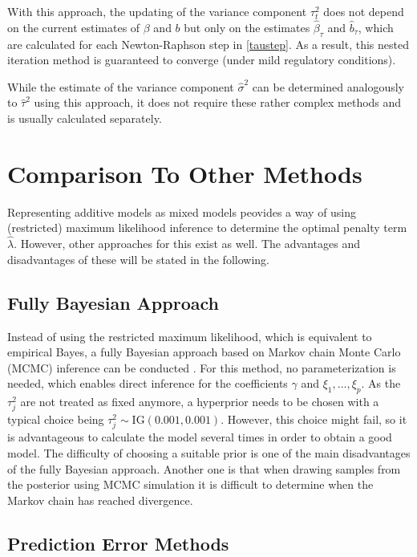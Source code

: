\documentclass[12pt]{article}
\begin{document}
With this approach, the updating of the variance component $\tau^2_t$ does not depend on the current estimates of $\beta$ and $b$ but only on the estimates $\hat{\beta}_{\tau}$ and $\hat{b}_\tau$, which are calculated for each Newton-Raphson step in \ref{taustep}. As a result, this nested iteration method is guaranteed to converge (under mild regulatory conditions).



While the estimate of the variance component $\hat{\sigma}^2$ can be determined analogously to $\hat{\tau}^2$ using this approach, it does not require these rather complex methods and is usually calculated separately.





\section{Comparison To Other Methods} %

Representing additive models as mixed models peovides a way of using (restricted) maximum likelihood inference to determine the optimal penalty term $\hat{\lambda}$. However, other approaches for this exist as well. The advantages and disadvantages of these will be stated in the following.

\subsection{Fully Bayesian Approach}

Instead of using the restricted maximum likelihood, which is equivalent to empirical Bayes, a fully Bayesian approach based on Markov chain Monte Carlo (MCMC) inference can be conducted \cite{kneib2006mixed}. For this method, no parameterization is needed, which enables direct inference for the coefficients $\gamma$ and $\xi_1,...,\xi_p$. As the $\tau_j^2$ are not treated as fixed anymore, a hyperprior needs to be chosen with a typical choice being $\tau^2_j \sim \text{IG}(0.001,0.001)$. However, this choice might fail, so it is advantageous to calculate the model several times in order to obtain a good model. The difficulty of choosing a suitable prior is one of the main disadvantages of the fully Bayesian approach. Another one is that when drawing samples from the posterior using MCMC simulation it is difficult to determine when the Markov chain has reached divergence.


\subsection{Prediction Error Methods}
\end{document}
